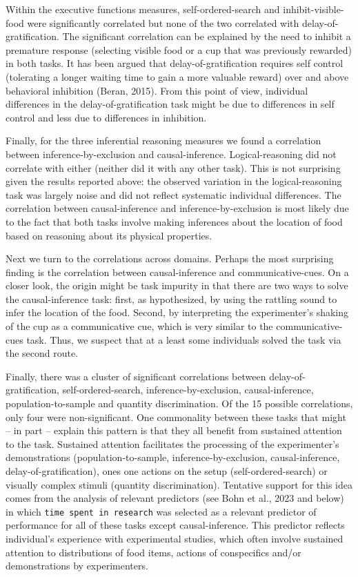 \documentclass[
  man,floatsintext]{apa6}
\begin{document}
Within the executive functions measures, self-ordered-search and inhibit-visible-food were significantly correlated but none of the two correlated with delay-of-gratification. The significant correlation can be explained by the need to inhibit a premature response (selecting visible food or a cup that was previously rewarded) in both tasks. It has been argued that delay-of-gratification requires self control (tolerating a longer waiting time to gain a more valuable reward) over and above behavioral inhibition (Beran, 2015). From this point of view, individual differences in the delay-of-gratification task might be due to differences in self control and less due to differences in inhibition.

Finally, for the three inferential reasoning measures we found a correlation between inference-by-exclusion and causal-inference. Logical-reasoning did not correlate with either (neither did it with any other task). This is not surprising given the results reported above: the observed variation in the logical-reasoning task was largely noise and did not reflect systematic individual differences. The correlation between causal-inference and inference-by-exclusion is most likely due to the fact that both tasks involve making inferences about the location of food based on reasoning about its physical properties.

Next we turn to the correlations across domains. Perhaps the most surprising finding is the correlation between causal-inference and communicative-cues. On a closer look, the origin might be task impurity in that there are two ways to solve the causal-inference task: first, as hypothesized, by using the rattling sound to infer the location of the food. Second, by interpreting the experimenter's shaking of the cup as a communicative cue, which is very similar to the communicative-cues task. Thus, we suspect that at a least some individuals solved the task via the second route.

Finally, there was a cluster of significant correlations between delay-of-gratification, self-ordered-search, inference-by-exclusion, causal-inference, population-to-sample and quantity discrimination. Of the 15 possible correlations, only four were non-significant. One commonality between these tasks that might -- in part -- explain this pattern is that they all benefit from sustained attention to the task. Sustained attention facilitates the processing of the experimenter's demonstrations (population-to-sample, inference-by-exclusion, causal-inference, delay-of-gratification), ones one actions on the setup (self-ordered-search) or visually complex stimuli (quantity discrimination). Tentative support for this idea comes from the analysis of relevant predictors (see Bohn et al., 2023 and below) in which \texttt{time\ spent\ in\ research} was selected as a relevant predictor of performance for all of these tasks except causal-inference. This predictor reflects individual's experience with experimental studies, which often involve sustained attention to distributions of food items, actions of conspecifics and/or demonstrations by experimenters.
\end{document}
